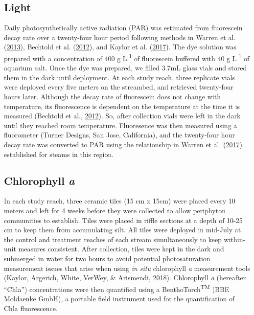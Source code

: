 \documentclass[double,12pt]{beavtex}
\begin{document}
  \subsection*{Light}\label{light}
  
  Daily photosynthetically active radiation (PAR) was estimated from
  fluorescein decay rate over a twenty-four hour period following methods
  in Warren et al. (\protect\hyperlink{ref-Warren2013}{2013}), Bechtold et
  al. (\protect\hyperlink{ref-Bechtold2012}{2012}), and Kaylor et al.
  (\protect\hyperlink{ref-Kaylor2017FS}{2017}). The dye solution was
  prepared with a concentration of 400 g L\textsuperscript{-1} of
  fluorescein buffered with 40 g L\textsuperscript{-1} of aquarium salt.
  Once the dye was prepared, we filled 3.7mL glass vials and stored them
  in the dark until deployment. At each study reach, three replicate vials
  were deployed every five meters on the streambed, and retrieved
  twenty-four hours later. Although the decay rate of fluorescein does not
  change with temperature, its fluorescence is dependent on the
  temperature at the time it is measured (Bechtold et al.,
  \protect\hyperlink{ref-Bechtold2012}{2012}). So, after collection vials
  were left in the dark until they reached room temperature. Fluoresence
  was then measured using a fluorometer (Turner Designs, San Jose,
  California), and the twenty-four hour decay rate was converted to PAR
  using the relationship in Warren et al.
  (\protect\hyperlink{ref-Warren2017}{2017}) established for steams in
  this region.
  
  \subsection*{\texorpdfstring{Chlorophyll
  \emph{a}}{Chlorophyll a}}\label{chlorophyll-a}
  
  In each study reach, three ceramic tiles (15 cm x 15cm) were placed
  every 10 meters and left for 4 weeks before they were collected to allow
  periphyton communities to establish. Tiles were placed in riffle
  sections at a depth of 10-25 cm to keep them from accumulating silt. All
  tiles were deployed in mid-July at the control and treatment reaches of
  each stream simultaneously to keep within-unit measures consistent.
  After collection, tiles were kept in the dark and submerged in water for
  two hours to avoid potential photosaturation measurement issues that
  arise when using \emph{in situ} chlorophyll \emph{a} measurement tools
  (Kaylor, Argerich, White, VerWey, \& Arismendi,
  \protect\hyperlink{ref-Kaylor2018}{2018}). Chlorophyll \emph{a}
  (hereafter ``Chla'') concentrations were then quantified using a
  BenthoTorch\textsuperscript{TM} (BBE Moldaenke GmbH), a portable field
  instrument used for the quantification of Chla fluorescence.
  
\end{document}
